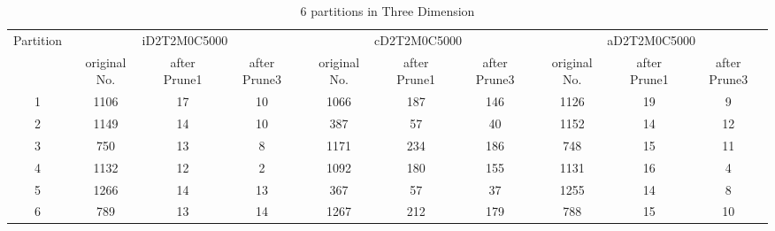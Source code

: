 \begin{table*}[t]
  \centering
\makeatletter
    \long{}
\makeatother
  \caption{6 partitions in Three Dimension}
    \vspace*{3pt}
  \footnotesize

  \label{table:partition6inThree}
  \begin{tabular}{|c||c|c|c|c|c|c|c|c|c|}
  \hline
  \multirow{2}{*}{Partition} &  \multicolumn{3}{|c|}{iD2T2M0C5000} & \multicolumn{3}{|c|}{cD2T2M0C5000} &\multicolumn{3}{|c|}{aD2T2M0C5000} \\\cline{2-10}
    &  original No. & after Prune1 & after Prune3 & original No. & after Prune1 & after Prune3 & original No. & after Prune1 & after Prune3\\\hline\hline

\cline{2-10}
    1 &  1106 & 17 & 10 & 1066 & 187 & 146 & 1126  & 19 & 9 \\\hline

\cline{2-10}
    2 &  1149 & 14 & 10 & 387 & 57 & 40 & 1152 & 14 & 12 \\\hline

\cline{2-10}
    3 &  750 & 13 & 8 & 1171 & 234 & 186 & 748 & 15 & 11 \\\hline
    
\cline{2-10}
    4 &  1132 & 12 & 2 & 1092 & 180& 155 & 1131 & 16 & 4 \\\hline
    
\cline{2-10}
    5 &  1266 & 14 & 13 & 367 & 57 & 37 & 1255 & 14 & 8 \\\hline
    
\cline{2-10}
    6 &  789 & 13 & 14 & 1267 & 212 & 179 & 788 & 15 & 10 \\\hline

  \end{tabular}
  \vspace*{-17pt}
\end{table*}


